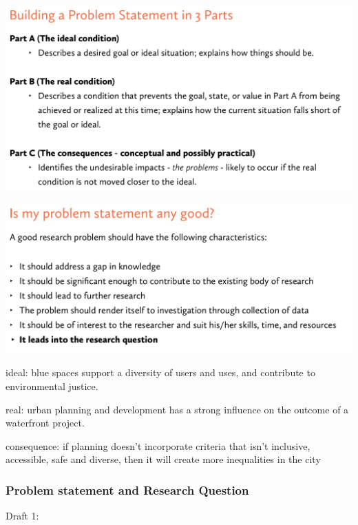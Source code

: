 \documentclass{article}
\begin{document}
\includegraphics[width=\textwidth]{problem_statement1}

\includegraphics[width=\textwidth]{problem_statement2}

\pagebreak

ideal: blue spaces support a diversity of users and uses, and contribute to environmental justice.

real: urban planning and development has a strong influence on the outcome of a waterfront project. 

consequence: if planning doesn't incorporate criteria that isn't inclusive, accessible, safe and diverse, then it will create more inequalities in the city

\subsubsection{Problem statement and Research Question}

Draft 1:

\end{document}
